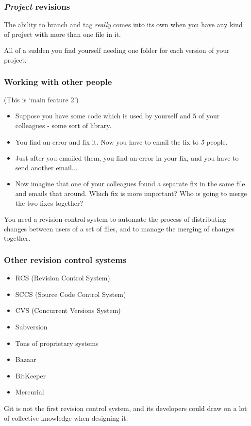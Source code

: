 \documentclass{beamer}
\begin{document}
\begin{frame}
  \frametitle{\emph{Project} revisions}

  The ability to branch and tag \emph{really} comes into its own when
  you have any kind of project with more than one file in it.

  All of a sudden you find yourself needing one folder for each
  version of your project.

\end{frame}

\begin{frame}
  \frametitle{Working with other people}
  (This is `main feature 2')

  \begin{itemize}
    \item Suppose you have some code which is used by yourself and 5 of your
      colleagues - some sort of library.

    \pause \item You find an error and fix it. Now you have to email the fix to \emph{5} people.

    \pause \item Just after you emailed them, you find an error in your fix, and you
    have to send another email...

    \pause \item Now imagine that one of your colleagues found a
    separate fix in the same file and emails that around. Which fix is
    more important? Who is going to merge the two fixes together?
  \end{itemize}

  \pause You need a revision control system to automate the process of
  distributing changes between users of a set of files, and to manage
  the merging of changes together.
\end{frame}

\begin{frame}
  \frametitle{Other revision control systems}
  \begin{itemize}
  \item RCS (Revision Control System)
  \item SCCS (Source Code Control System)
  \item CVS (Concurrent Versions System)
  \item Subversion
  \item Tons of proprietary systems
  \item Bazaar
  \item BitKeeper
  \item Mercurial
  \end{itemize}

  \pause Git is not the first revision control system, and its
  developers could draw on a lot of collective knowledge when
  designing it.
\end{frame}
\end{document}
